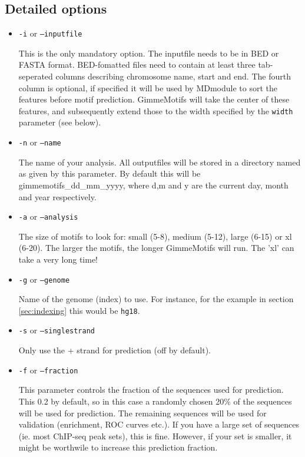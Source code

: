 \documentclass[11pt]{article}
\begin{document}
\subsection{Detailed options}
\begin{itemize}
\item 
\texttt{-i} or \texttt{--inputfile}

This is the only mandatory option. The inputfile needs to be in BED or FASTA format. BED-fomatted files need to contain at least three tab-seperated columns describing chromosome name, start and end. The fourth column is optional, if specified it will be used by MDmodule to sort the features before motif prediction. GimmeMotifs will take the center of these features, and subsequently extend those to the width specified by the \texttt{width} parameter (see below).

\item 
\texttt{-n} or \texttt{--name}

The name of your analysis. All outputfiles will be stored in a directory named as given by this parameter. By default this will be gimmemotifs\_dd\_mm\_yyyy, where d,m and y are the current day, month and year respectively.

\item 
\texttt{-a} or \texttt{--analysis}

The size of motifs to look for: small (5-8), medium (5-12), large (6-15) or xl (6-20). The larger the motifs, the longer GimmeMotifs will run. The 'xl' can take a very long time!

\item 
\texttt{-g} or \texttt{--genome}

Name of the genome (index) to use. For instance, for the example in section \ref{sec:indexing} this would be \texttt{hg18}.

\item 
\texttt{-s} or \texttt{--singlestrand}

Only use the + strand for prediction (off by default).

\item 
\texttt{-f} or \texttt{--fraction}

This parameter controls the fraction of the sequences used for prediction. This 0.2 by default, so in this case a randomly chosen 20\% of the sequences will be used for prediction. The remaining sequences will be used for validation (enrichment, ROC curves etc.). If you have a large set of sequences (ie. most ChIP-seq peak sets), this is fine. However, if your set is smaller, it might be worthwile to increase this prediction fraction.


\end{itemize}
\end{document}
